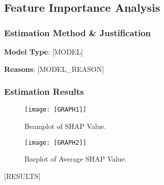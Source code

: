 \subsection{Feature Importance Analysis}

\subsubsection{Estimation Method \& Justification}

\textbf{Model Type}: [MODEL]

\textbf{Reasons}: [MODEL_REASON]


\subsubsection{Estimation Results}

\begin{minipage}[t]{0.5\linewidth}
    \begin{figure}[H]
        \centering
        \vspace{-1.5cm}
        \texttt{[image: [GRAPH1]]}
        \caption{Beamplot of SHAP Value.}
    \end{figure}
\vfill
\end{minipage}
\hfill
\begin{minipage}[t]{0.5\linewidth}
    \begin{figure}[H]
        \centering
        \vspace{-1.5cm}
        \texttt{[image: [GRAPH2]]}
        \caption{Barplot of Average SHAP Value.}
    \end{figure}
\end{minipage}

[RESULTS]